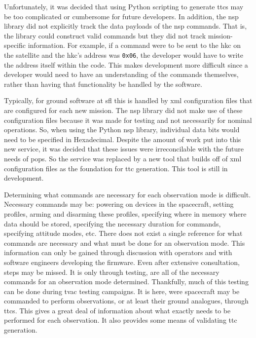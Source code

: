 Unfortunately, it was decided that using Python scripting to generate
\glspl{ttc} may be too complicated or cumbersome for future developers. In
addition, the \gls{nsp} library did not explicitly track the data payloads of
the \gls{nsp} commands. That is, the library could construct valid commands but
they did not track mission-specific information. For example, if a command were
to be sent to the \gls{hkc} on the satellite and the \gls{hkc}'s address was
\texttt{0x06}, the developer would have to write the address itself within the
code. This makes development more difficult since a developer would need to
have an understanding of the commands themselves, rather than having that
functionality be handled by the software. 

Typically, for ground software at \gls{sfl} this is handled by \gls{xml}
configuration files that are configured for each new mission.  The \gls{nsp}
library did not make use of these configuration files because it was made for
testing and not necessarily for nominal operations. So, when using the Python
\gls{nsp} library, individual data bits would need to be specified in
Hexadecimal.  Despite the amount of work put into this new service, it was
decided that these issues were irreconcilable with the future needs of
\gls{pops}. So the service was replaced by a new tool that builds off of
\gls{xml} configuration files as the foundation for \gls{ttc} generation.  This
tool is still in development.

Determining what commands are necessary for each observation mode is difficult.
Necessary commands may be: powering on devices in the spacecraft, setting
profiles, arming and disarming these profiles, specifying where in memory where
data should be stored, specifying the necessary duration for commands,
specifying attitude modes, etc.  There does not exist a single reference for
what commands are necessary and what must be done for an observation mode. This
information can only be gained through discussion with operators and with
software engineers developing the firmware.  Even after extensive consultation,
steps may be missed. It is only through testing, are all of the necessary
commands for an observation mode determined.  Thankfully, much of this testing
can be done during \gls{tvac} testing campaigns. It is here, were spacecraft
may be commanded to perform observations, or at least their ground analogues,
through \glspl{ttc}.  This gives a great deal of information about what exactly
needs to be performed for each observation. It also provides some means of
validating \gls{ttc} generation.



